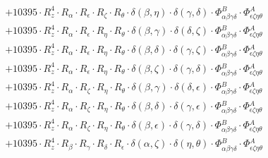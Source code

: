 \documentclass{article}
\begin{document}
\begin{equation}
\begin{array}{c}
 \\[0.2em] 		 + 10395 \cdot R_{z}^{4} \cdot R_{\alpha{}} \cdot R_{\epsilon{}} \cdot R_{\zeta{}} \cdot R_{\theta{}} \cdot \delta{}\left(\beta{}, \eta{}\right) \cdot \delta{}\left(\gamma{}, \delta{}\right) \cdot \Phi{}^{B}_{\alpha{}\beta{}\gamma{}\delta{}} \cdot \Phi{}^{A}_{\epsilon{}\zeta{}\eta{}\theta{}} 
 \\[0.2em] 		 + 10395 \cdot R_{z}^{4} \cdot R_{\alpha{}} \cdot R_{\epsilon{}} \cdot R_{\eta{}} \cdot R_{\theta{}} \cdot \delta{}\left(\beta{}, \gamma{}\right) \cdot \delta{}\left(\delta{}, \zeta{}\right) \cdot \Phi{}^{B}_{\alpha{}\beta{}\gamma{}\delta{}} \cdot \Phi{}^{A}_{\epsilon{}\zeta{}\eta{}\theta{}} 
 \\[0.2em] 		 + 10395 \cdot R_{z}^{4} \cdot R_{\alpha{}} \cdot R_{\epsilon{}} \cdot R_{\eta{}} \cdot R_{\theta{}} \cdot \delta{}\left(\beta{}, \delta{}\right) \cdot \delta{}\left(\gamma{}, \zeta{}\right) \cdot \Phi{}^{B}_{\alpha{}\beta{}\gamma{}\delta{}} \cdot \Phi{}^{A}_{\epsilon{}\zeta{}\eta{}\theta{}} 
 \\[0.2em] 		 + 10395 \cdot R_{z}^{4} \cdot R_{\alpha{}} \cdot R_{\epsilon{}} \cdot R_{\eta{}} \cdot R_{\theta{}} \cdot \delta{}\left(\beta{}, \zeta{}\right) \cdot \delta{}\left(\gamma{}, \delta{}\right) \cdot \Phi{}^{B}_{\alpha{}\beta{}\gamma{}\delta{}} \cdot \Phi{}^{A}_{\epsilon{}\zeta{}\eta{}\theta{}} 
 \\[0.2em] 		 + 10395 \cdot R_{z}^{4} \cdot R_{\alpha{}} \cdot R_{\zeta{}} \cdot R_{\eta{}} \cdot R_{\theta{}} \cdot \delta{}\left(\beta{}, \gamma{}\right) \cdot \delta{}\left(\delta{}, \epsilon{}\right) \cdot \Phi{}^{B}_{\alpha{}\beta{}\gamma{}\delta{}} \cdot \Phi{}^{A}_{\epsilon{}\zeta{}\eta{}\theta{}} 
 \\[0.2em] 		 + 10395 \cdot R_{z}^{4} \cdot R_{\alpha{}} \cdot R_{\zeta{}} \cdot R_{\eta{}} \cdot R_{\theta{}} \cdot \delta{}\left(\beta{}, \delta{}\right) \cdot \delta{}\left(\gamma{}, \epsilon{}\right) \cdot \Phi{}^{B}_{\alpha{}\beta{}\gamma{}\delta{}} \cdot \Phi{}^{A}_{\epsilon{}\zeta{}\eta{}\theta{}} 
 \\[0.2em] 		 + 10395 \cdot R_{z}^{4} \cdot R_{\alpha{}} \cdot R_{\zeta{}} \cdot R_{\eta{}} \cdot R_{\theta{}} \cdot \delta{}\left(\beta{}, \epsilon{}\right) \cdot \delta{}\left(\gamma{}, \delta{}\right) \cdot \Phi{}^{B}_{\alpha{}\beta{}\gamma{}\delta{}} \cdot \Phi{}^{A}_{\epsilon{}\zeta{}\eta{}\theta{}} 
 \\[0.2em] 		 + 10395 \cdot R_{z}^{4} \cdot R_{\beta{}} \cdot R_{\gamma{}} \cdot R_{\delta{}} \cdot R_{\epsilon{}} \cdot \delta{}\left(\alpha{}, \zeta{}\right) \cdot \delta{}\left(\eta{}, \theta{}\right) \cdot \Phi{}^{B}_{\alpha{}\beta{}\gamma{}\delta{}} \cdot \Phi{}^{A}_{\epsilon{}\zeta{}\eta{}\theta{}} 

\end{array}
\end{equation}
\end{document}
